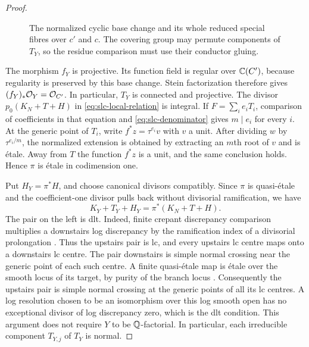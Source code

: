 \begin{proof}
\begin{figure}[ht]
\centering
{}
\caption{The normalized cyclic base change and its whole reduced special
fibres over $c'$ and $c$. The covering group may permute components of
$T_Y$, so the residue comparison must use their conductor gluing.}
\label{fig:root-cover}
\end{figure}

The morphism $f_Y$ is projective.  Its function
field is regular over $\mathbb C(C')$, because regularity is preserved by this
base change.  Stein factorization therefore gives
$(f_Y)_*\mathcal O_Y=\mathcal O_{C'}$. In particular, $T_Y$ is connected and
projective.
The divisor $p_0(K_N+T+H)$ in
\eqref{eq:slc-local-relation} is integral.  If
$F=\sum_i e_iT_i$, comparison of coefficients in that equation and
\eqref{eq:slc-denominator} gives $m\mid e_i$ for every $i$.
At the generic point of $T_i$, write $f^*z=\tau^{e_i}v$ with $v$ a unit.
After dividing $w$ by $\tau^{e_i/m}$, the normalized extension is
obtained by extracting an $m$th root of $v$ and is \'{e}tale.  Away from
$T$ the function $f^*z$ is a unit, and the same conclusion holds.
Hence $\pi$ is \'{e}tale in codimension one.

Put $H_Y=\pi^*H$, and choose canonical divisors compatibly.  Since
$\pi$ is quasi-\'{e}tale and the coefficient-one divisor pulls back
without divisorial ramification, we have
\begin{equation}
 \label{eq:slc-cover-crepant}
 K_Y+T_Y+H_Y=\pi^*(K_N+T+H).
\end{equation}
The pair on the left is dlt.  Indeed, finite crepant discrepancy
comparison multiplies a downstairs log discrepancy by the
ramification index of a divisorial prolongation
\cite[Proposition~5.20]{KollarMori1998}.  Thus the upstairs pair is lc,
and every upstairs lc centre maps onto a downstairs lc centre.
The pair downstairs is simple normal crossing near the generic point
of each such centre.  A finite quasi-\'{e}tale map is \'{e}tale over the
smooth locus of its target, by purity of the branch locus
\cite[Tag~0BMB]{StacksProject}.  Consequently the upstairs pair is
simple normal crossing at the generic points of all its lc centres.
A log resolution chosen to be an isomorphism over this log smooth open
has no exceptional divisor of log discrepancy zero, which is the dlt
condition.  This argument does not require $Y$ to be $\mathbb Q$-factorial.
In particular, each irreducible component $T_{Y,j}$ of $T_Y$ is normal.


\end{proof}
